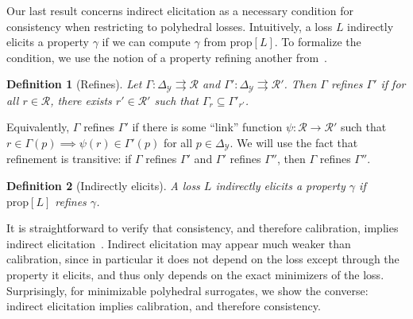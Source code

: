 \documentclass[11pt]{article}
\newcommand{\prop}[1]{\mathrm{prop}[#1]}
\newcommand{\simplex}{\Delta_\Y}
\newcommand{\R}{\mathcal{R}}
\newcommand{\Y}{\mathcal{Y}}
\newcommand{\toto}{\rightrightarrows}
\newtheorem{definition}{Definition}
\begin{document}
Our last result concerns indirect elicitation as a necessary condition for consistency when restricting to polyhedral losses.
Intuitively, a loss $L$ indirectly elicits a property $\gamma$ if we can compute $\gamma$ from $\prop L$.
To formalize the condition, we use the notion of a property refining another from~\citet{frongillo2014general}.

\begin{definition}[Refines]
  \label{def:refines}
	Let $\Gamma:\simplex \toto \R$ and $\Gamma':\simplex\toto \R'$.
	Then $\Gamma$ \emph{refines} $\Gamma'$ if for all $r \in \R$, there exists $r' \in \R'$ such that $\Gamma_{r} \subseteq \Gamma'_{r'}$.
\end{definition}
Equivalently, $\Gamma$ refines $\Gamma'$ if there is some ``link'' function $\psi:\R\to\R'$ such that $r\in\Gamma(p) \implies \psi(r) \in \Gamma'(p)$ for all $p\in\simplex$.
We will use the fact that refinement is transitive: if $\Gamma$ refines $\Gamma'$ and $\Gamma'$ refines $\Gamma''$, then $\Gamma$ refines $\Gamma''$.

\begin{definition}[Indirectly elicits]
  \label{def:indirectly-elicits}
  A loss $L$ \emph{indirectly elicits} a property $\gamma$ if $\prop L$ refines $\gamma$.
\end{definition}

It is straightforward to verify that consistency, and therefore calibration, implies indirect elicitation~\citep{finocchiaro2021unifying,agarwal2015consistent,steinwart2008support}.
Indirect elicitation may appear much weaker than calibration, since in particular it does not depend on the loss except through the property it elicits, and thus only depends on the exact minimizers of the loss.
Surprisingly, for minimizable polyhedral surrogates, we show the converse: indirect elicitation implies calibration, and therefore consistency.
\end{document}
